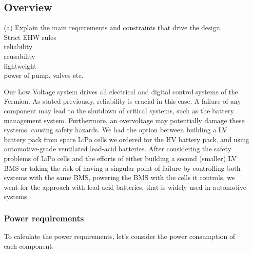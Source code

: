 \subsection{Overview}
(a) Explain the main requirements and constraints that drive the design. \\
Strict EHW rules \\
reliability \\
reusability \\
lightweight \\
power of pump, valves etc. 

\par Our Low Voltage system drives all electrical and digital control systems of the Fermion. As stated previously,
reliability is crucial in this case. A failure of any component may lead to the shutdown of critical systems, such as the battery management system.
Furthermore, an overvoltage may potentially damage these systems, causing safety hazards. We had the option between building a LV battery pack from spare LiPo cells we ordered for the HV battery pack, and using automotive-grade ventilated lead-acid batteries.
After considering the safety problems of LiPo cells and the efforts of either building a second (smaller) LV BMS or taking the risk of having a singular point of failure by controlling both systems with the same BMS, powering the BMS with the cells it controls, we went for the approach with lead-acid batteries, that is widely used in automotive systems \\
\subsubsection*{Power requirements}
To calculate the power requirements, let's consider the power consumption of each component:


